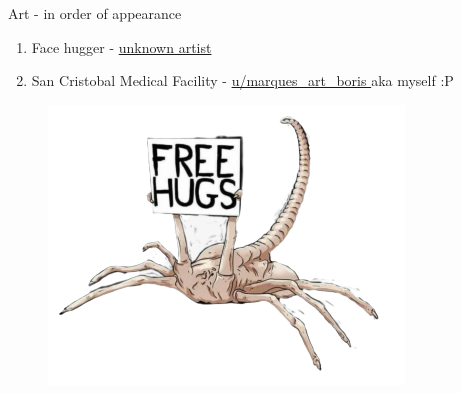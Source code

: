 \begin{rpg-commentbox}{Art - in order of appearance}
\begin{enumerate}
        \item Face hugger - \href{https://i.pinimg.com/originals/09/90/9d/09909d88705fc1303381a6672b05163b.jpg}{unknown artist}

        \item San Cristobal Medical Facility - \href{https://www.reddit.com/r/SWN/comments/k53xgb/map_series_sevastopol_san_cristobal_medical/}{u/marques\_art\_boris
        } aka myself :P
    \end{enumerate}
\end{rpg-commentbox} 

  
\newsect

\begin{figure}[!b]
    \centering
    \includegraphics[width=.45\textwidth]{img/bg/free-hugs.png}
\end{figure}


\clearpage
